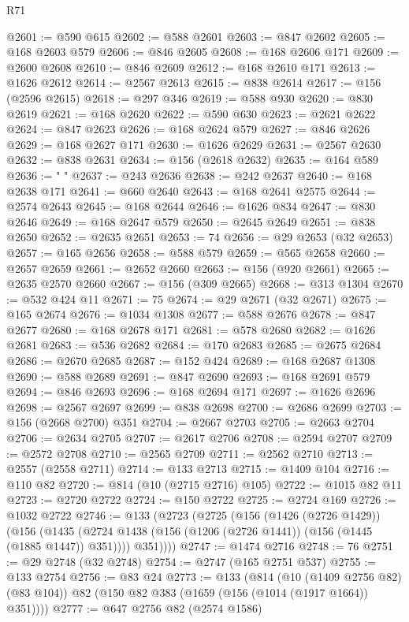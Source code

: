 \begin{lexlean}{R71}
\begin{coremodule}
@2601 := @590 @615
@2602 := @588 @2601
@2603 := @847 @2602
@2605 := @168 @2603 @579
@2606 := @846 @2605
@2608 := @168 @2606 @171
@2609 := @2600 @2608
@2610 := @846 @2609
@2612 := @168 @2610 @171
@2613 := @1626 @2612
@2614 := @2567 @2613
@2615 := @838 @2614
@2617 := @156 (@2596 @2615)
@2618 := @297 @346
@2619 := @588 @930
@2620 := @830 @2619
@2621 := @168 @2620
@2622 := @590 @630
@2623 := @2621 @2622
@2624 := @847 @2623
@2626 := @168 @2624 @579
@2627 := @846 @2626
@2629 := @168 @2627 @171
@2630 := @1626 @2629
@2631 := @2567 @2630
@2632 := @838 @2631
@2634 := @156 (@2618 @2632)
@2635 := @164 @589
@2636 := " "
@2637 := @243 @2636
@2638 := @242 @2637
@2640 := @168 @2638 @171
@2641 := @660 @2640
@2643 := @168 @2641 @2575
@2644 := @2574 @2643
@2645 := @168 @2644
@2646 := @1626 @834
@2647 := @830 @2646
@2649 := @168 @2647 @579
@2650 := @2645 @2649
@2651 := @838 @2650
@2652 := @2635 @2651
@2653 := 74
@2656 := @29 @2653 (@32 @2653)
@2657 := @165 @2656
@2658 := @588 @579
@2659 := @565 @2658
@2660 := @2657 @2659
@2661 := @2652 @2660
@2663 := @156 (@920 @2661)
@2665 := @2635 @2570 @2660
@2667 := @156 (@309 @2665)
@2668 := @313 @1304
@2670 := @532 @424 @11
@2671 := 75
@2674 := @29 @2671 (@32 @2671)
@2675 := @165 @2674
@2676 := @1034 @1308
@2677 := @588 @2676
@2678 := @847 @2677
@2680 := @168 @2678 @171
@2681 := @578 @2680
@2682 := @1626 @2681
@2683 := @536 @2682
@2684 := @170 @2683
@2685 := @2675 @2684
@2686 := @2670 @2685
@2687 := @152 @424
@2689 := @168 @2687 @1308
@2690 := @588 @2689
@2691 := @847 @2690
@2693 := @168 @2691 @579
@2694 := @846 @2693
@2696 := @168 @2694 @171
@2697 := @1626 @2696
@2698 := @2567 @2697
@2699 := @838 @2698
@2700 := @2686 @2699
@2703 := @156 (@2668 @2700) @351
@2704 := @2667 @2703
@2705 := @2663 @2704
@2706 := @2634 @2705
@2707 := @2617 @2706
@2708 := @2594 @2707
@2709 := @2572 @2708
@2710 := @2565 @2709
@2711 := @2562 @2710
@2713 := @2557 (@2558 @2711)
@2714 := @133 @2713
@2715 := @1409 @104
@2716 := @110 @82
@2720 := @814 (@10 (@2715 @2716) @105)
@2722 := @1015 @82 @11
@2723 := @2720 @2722
@2724 := @150 @2722
@2725 := @2724 @169
@2726 := @1032 @2722
@2746 := @133
    (@2723
      (@2725
        (@156
          (@1426 (@2726 @1429))
          (@156
            (@1435 (@2724 @1438 (@156 (@1206 (@2726 @1441)) (@156 (@1445 (@1885 @1447)) @351))))
            @351))))
@2747 := @1474 @2716
@2748 := 76
@2751 := @29 @2748 (@32 @2748)
@2754 := @2747 (@165 @2751 @537)
@2755 := @133 @2754
@2756 := @83 @24
@2773 := @133
    (@814
      (@10 (@1409 @2756 @82) (@83 @104))
      @82
      (@150 @82 @383 (@1659 (@156 (@1014 (@1917 @1664)) @351))))
@2777 := @647 @2756 @82 (@2574 @1586)

\end{coremodule}
\end{lexlean}

